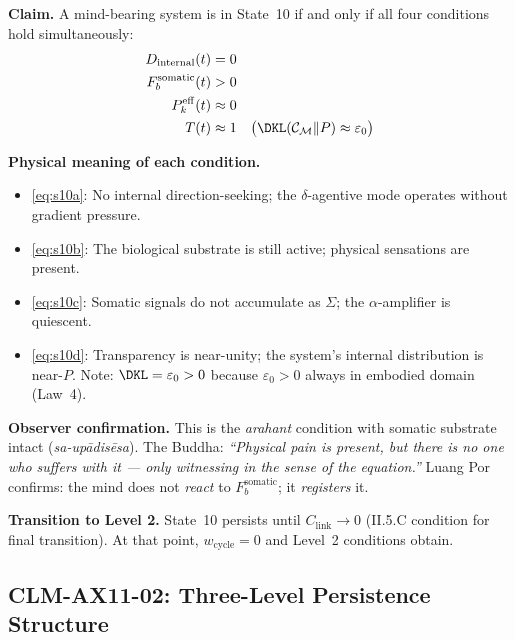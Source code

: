 \documentclass[12pt, a4paper]{article}
\providecommand{\eps}{\varepsilon_0}
\providecommand{\wcyc}{w_{\mathrm{cycle}}}
\providecommand{\Fbsom}{F_b^{\mathrm{somatic}}}
\providecommand{\Clink}{C_{\mathrm{link}}}
\providecommand{\Pkeff}{P_k^{\mathrm{eff}}}
\providecommand{\Dint}{D_{\mathrm{internal}}}
\begin{document}

\begin{formalbox}[title={CLM-AX11-01: State 10 in CRF
  (Frictionless Witness)}]
\textbf{Claim.}
A mind-bearing system is in State~10 if and only if all four
conditions hold simultaneously:
\begin{align}
  \Dint(t) &= 0 \label{eq:s10a}\\
  \Fbsom(t) &> 0 \label{eq:s10b}\\
  \Pkeff(t) &\approx 0 \label{eq:s10c}\\
  T(t) &\approx 1 \quad
    \bigl(\DKL(\mathcal{C}_\mathcal{M}\|P) \approx \eps\bigr)
    \label{eq:s10d}
\end{align}

\textbf{Physical meaning of each condition.}
\begin{itemize}[leftmargin=*, itemsep=2pt]
\item \eqref{eq:s10a}: No internal direction-seeking; the
  $\delta$-agentive mode operates without gradient pressure.
\item \eqref{eq:s10b}: The biological substrate is still active;
  physical sensations are present.
\item \eqref{eq:s10c}: Somatic signals do not accumulate as
  $\Sigma$; the $\alpha$-amplifier is quiescent.
\item \eqref{eq:s10d}: Transparency is near-unity; the system's
  internal distribution is near-$P$. Note: $\DKL = \eps > 0$
  because $\eps > 0$ always in embodied domain (Law~4).
\end{itemize}

\textbf{Observer confirmation.}
This is the \textit{arahant} condition with somatic substrate
intact (\textit{sa-up\={a}dis\={e}sa}). The Buddha:
\textit{``Physical pain is present, but there is no one who
suffers with it --- only witnessing in the sense of the
equation.''} Luang Por confirms: the mind does not
\emph{react} to $\Fbsom$; it \emph{registers} it.

\textbf{Transition to Level 2.}
State~10 persists until $\Clink \to 0$
(II.5.C condition for final transition). At that point,
$\wcyc = 0$ and Level~2 conditions obtain.
\end{formalbox}

\subsection{CLM-AX11-02: Three-Level Persistence Structure}
\end{document}
